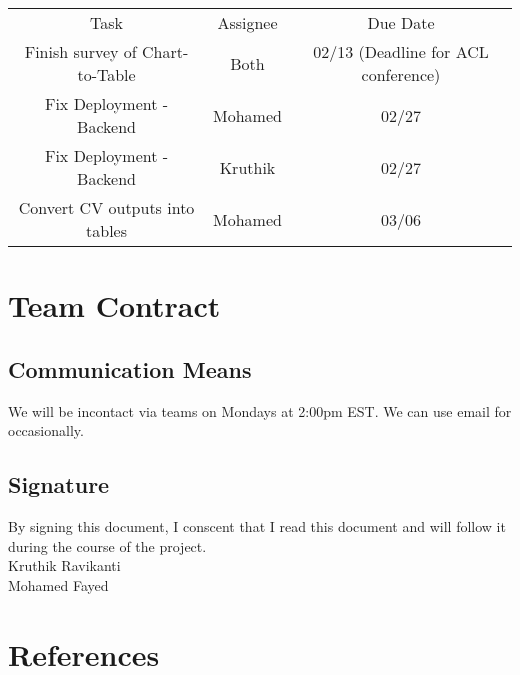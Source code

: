 \documentclass[
	letterpaper, %
]{jdf}
\begin{document}
            \begin{table}
                 \begin{tabular}{|c|c|c|}
                     Task & Assignee & Due Date \\
                     Finish survey of Chart-to-Table & Both & 02/13 (Deadline for ACL conference) \\
                     Fix Deployment - Backend & Mohamed  & 02/27 \\
                     Fix Deployment - Backend & Kruthik & 02/27 \\
                     Convert CV outputs into tables & Mohamed & 03/06 \\
                 \end{tabular}
                 \caption{}
                 \label{}
                  \end{table}

\section{Team Contract}\label{sect:team-contract}
\subsection{Communication Means}
We will be incontact via teams on Mondays at 2:00pm EST.
We can use email for occasionally.
\subsection{Signature}
By signing this document, I conscent that I read this document and will follow it
during the course of the project.\\
Kruthik Ravikanti \\
Mohamed Fayed

\section{References}
\printbibliography[heading=none]
\end{document}
